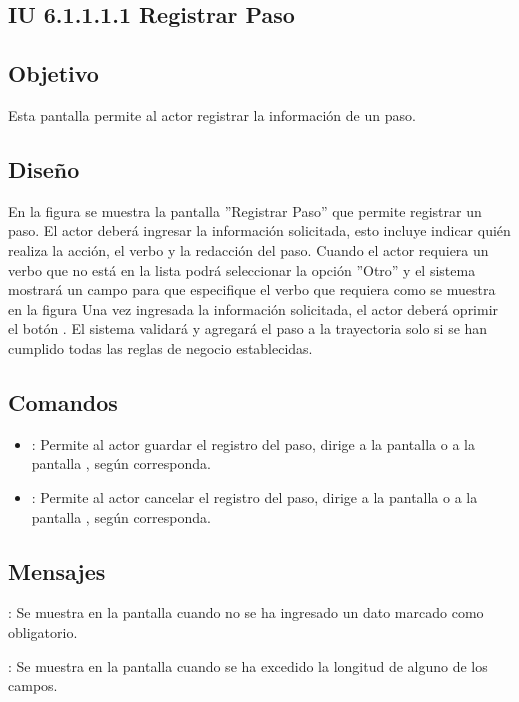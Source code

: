 \subsection{IU 6.1.1.1.1 Registrar Paso}

\subsection{Objetivo}
	Esta pantalla permite al actor registrar la información de un paso.
\subsection{Diseño}
	En la figura  se muestra la pantalla ''Registrar Paso'' que permite registrar un paso. El actor deberá ingresar la información solicitada, esto incluye indicar quién realiza la acción, el verbo y la redacción del paso.
	Cuando el actor requiera un verbo que no está en la lista podrá seleccionar la opción ''Otro'' y el sistema mostrará un campo para que especifique el verbo que requiera como se muestra en la figura 
	Una vez ingresada la información solicitada, el actor deberá oprimir el botón  . El sistema validará y agregará el paso a la trayectoria solo si se han cumplido todas las reglas de negocio establecidas.

\subsection{Comandos}
\begin{itemize}
	\item {}: Permite al actor guardar el registro del paso, dirige a la pantalla  o a la pantalla , según corresponda.
	\item {}: Permite al actor cancelar el registro del paso, dirige a la pantalla  o a la pantalla , según corresponda.
\end{itemize}

\subsection{Mensajes}

\begin{Citemize}
	\item {}: Se muestra en la pantalla  cuando no se ha ingresado un dato marcado como obligatorio.
	\item {}: Se muestra en la pantalla  cuando se ha excedido la longitud de alguno de los campos.
\end{Citemize}

